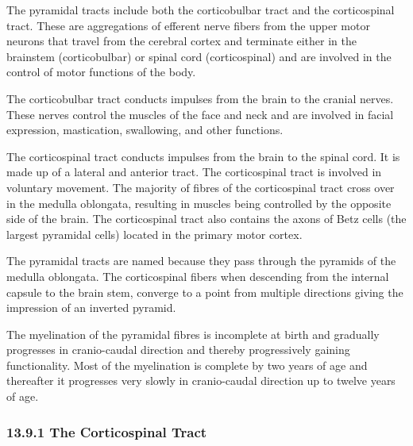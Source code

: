 The pyramidal tracts include both the corticobulbar tract and the
corticospinal tract. These are aggregations of efferent nerve fibers
from the upper motor neurons that travel from the cerebral cortex and
terminate either in the brainstem (corticobulbar) or spinal cord
(corticospinal) and are involved in the control of motor functions of
the body.

The corticobulbar tract conducts impulses from the brain to the cranial
nerves. These nerves control the muscles of the face and neck and are
involved in facial expression, mastication, swallowing, and other
functions.

The corticospinal tract conducts impulses from the brain to the spinal
cord. It is made up of a lateral and anterior tract. The corticospinal
tract is involved in voluntary movement. The majority of fibres of the
corticospinal tract cross over in the medulla oblongata, resulting in
muscles being controlled by the opposite side of the brain. The
corticospinal tract also contains the axons of Betz cells (the largest
pyramidal cells) located in the primary motor cortex.

The pyramidal tracts are named because they pass through the pyramids of
the medulla oblongata. The corticospinal fibers when descending from the
internal capsule to the brain stem, converge to a point from multiple
directions giving the impression of an inverted pyramid.

The myelination of the pyramidal fibres is incomplete at birth and
gradually progresses in cranio-caudal direction and thereby
progressively gaining functionality. Most of the myelination is complete
by two years of age and thereafter it progresses very slowly in
cranio-caudal direction up to twelve years of age.

\hypertarget{the-corticospinal-tract-1}{}
\hypertarget{the-corticospinal-tract}{%
\subsubsection{\texorpdfstring{{13.9.1} The Corticospinal
Tract}{13.9.1 The Corticospinal Tract}}\label{the-corticospinal-tract}}

